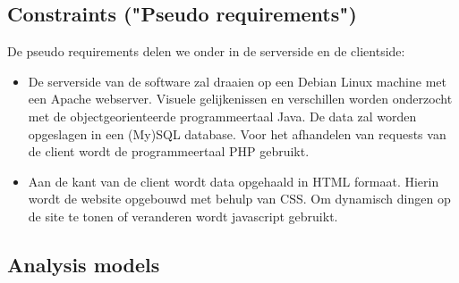 \documentclass[a4paper,10pt]{article}
\begin{document}
		\subsection{Constraints ("Pseudo requirements")}
			De pseudo requirements delen we onder in de serverside en de clientside:
			\begin{itemize}
				\item De serverside van de software zal draaien op een Debian Linux machine met een Apache webserver. Visuele gelijkenissen en verschillen worden onderzocht met de objectgeorienteerde programmeertaal Java. De data zal worden opgeslagen in een (My)SQL database. Voor het afhandelen van requests van de client wordt de programmeertaal PHP gebruikt.
				\item Aan de kant van de client wordt data opgehaald in HTML formaat. Hierin wordt de website opgebouwd met behulp van CSS. Om dynamisch dingen op de site te tonen of veranderen wordt javascript gebruikt.
			\end{itemize}
				
		\subsection{Analysis models}
\end{document}
